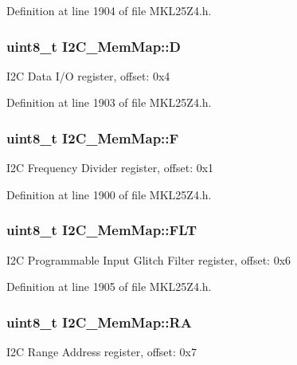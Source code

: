 Definition at line 1904 of file M\+K\+L25\+Z4.\+h.

\subsubsection[{\texorpdfstring{D}{D}}]{\setlength{\rightskip}{0pt plus 5cm}uint8\+\_\+t I2\+C\+\_\+\+Mem\+Map\+::D}\hypertarget{struct_i2_c___mem_map_a44f0a2e82a172b16e1241939185790cf}{}\label{struct_i2_c___mem_map_a44f0a2e82a172b16e1241939185790cf}
I2C Data I/O register, offset\+: 0x4 

Definition at line 1903 of file M\+K\+L25\+Z4.\+h.

\subsubsection[{\texorpdfstring{F}{F}}]{\setlength{\rightskip}{0pt plus 5cm}uint8\+\_\+t I2\+C\+\_\+\+Mem\+Map\+::F}\hypertarget{struct_i2_c___mem_map_a9f07a2e505dda38873798958a6c9f432}{}\label{struct_i2_c___mem_map_a9f07a2e505dda38873798958a6c9f432}
I2C Frequency Divider register, offset\+: 0x1 

Definition at line 1900 of file M\+K\+L25\+Z4.\+h.

\subsubsection[{\texorpdfstring{F\+LT}{FLT}}]{\setlength{\rightskip}{0pt plus 5cm}uint8\+\_\+t I2\+C\+\_\+\+Mem\+Map\+::\+F\+LT}\hypertarget{struct_i2_c___mem_map_a6520708827670dc2938e6cdec0264763}{}\label{struct_i2_c___mem_map_a6520708827670dc2938e6cdec0264763}
I2C Programmable Input Glitch Filter register, offset\+: 0x6 

Definition at line 1905 of file M\+K\+L25\+Z4.\+h.

\subsubsection[{\texorpdfstring{RA}{RA}}]{\setlength{\rightskip}{0pt plus 5cm}uint8\+\_\+t I2\+C\+\_\+\+Mem\+Map\+::\+RA}\hypertarget{struct_i2_c___mem_map_a9f17398ec3278c30924dd797dea9788a}{}\label{struct_i2_c___mem_map_a9f17398ec3278c30924dd797dea9788a}
I2C Range Address register, offset\+: 0x7 

